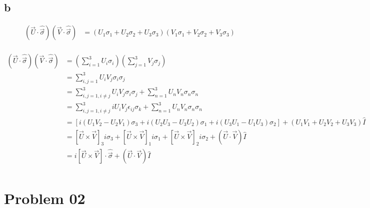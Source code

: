 \documentclass[letter]{article}
\begin{document}
\subsection*{b} 
\begin{align*}
	\left(\vec{U} \cdot  \hat{\vec{\sigma}}\right) 
	\left(\vec{V} \cdot  \hat{\vec{\sigma}}\right) &= 
	\left(U_1 \sigma_1 + U_2 \sigma_2 + U_3 \sigma_3\right)
	\left(V_1 \sigma_1 + V_2 \sigma_2 + V_3 \sigma_3\right)\\
\end{align*}

\begin{align*}
	\left(\vec{U} \cdot \hat{\vec{\sigma}}\right)
	\left(\vec{V}\cdot \hat{\vec{\sigma}}\right) &= 
	\left(\sum_{i= 1}^{3} U_i \sigma_i\right)
	\left(\sum_{j=1}^{3} V_j \sigma_j\right) \\
	&= 
\sum_{i,j = 1}^{3} U_i V_j \sigma_i \sigma_j
	\\
	&= 
\sum_{i,j = 1, i\neq j}^{3} U_i V_j \sigma_i \sigma_j + \sum_{n=1}^{3} U_n V_n \sigma_n \sigma_n 
	\\ 
	&= 
	\sum_{i,j = 1, i\neq j}^{3} i U_i V_j \epsilon_{ij} \sigma_k + \sum_{n=1}^{3} U_n V_n \sigma_n \sigma_n 
	\\ 
	&= \left[  i(U_1 V_2 - U_2 V_1) \sigma_3 + i (U_2 U_3 - U_3 U_2) \sigma_1 + i (U_3 U_1 - U_1 U_3) \sigma_2  \right] + (U_1 V_1 + U_2 V_2 + U_3 V_3) \hat{I} \\ 
	&= [ \vec{U} \times  \vec{V}]_3 i \sigma_3 + [ \vec{U} \times \vec{V}]_1 i \sigma_1 + 
	[\vec{U} \times  \vec{V}]_2 i \sigma_2 + (\vec{U} \cdot \vec{V}) \hat{I}\\
	&= i \left[ \vec{U} \times \vec{V}\right] \cdot \hat{\vec{\sigma}} + \left(\vec{U}\cdot \vec{V}\right) \hat{I} \\
\end{align*}



\newpage
\section*{Problem 02}
\end{document}
